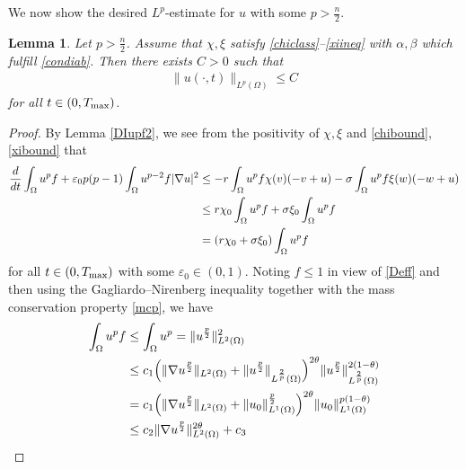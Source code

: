 \documentclass[12pt,reqno,draft]{article}
\numberwithin{equation}{section}
\theoremstyle{theorem}
\newtheorem{lem}[thm]{Lemma}
\theoremstyle{definition}
\newcommand{\ep}{\varepsilon}
\newcommand{\Tmax}{T_{\rm max}}
\begin{document}
We now show the desired $L^p$-estimate for $u$ 
with some $p>\frac{n}{2}$.
%
\begin{lem} \label{uLpbdd2}
 Let $p>\frac{n}{2}$. 
 Assume that $\chi, \xi$ satisfy \eqref{chiclass}--\eqref{xiineq} 
 with $\alpha, \beta$ which fulfill \eqref{condiab}. 
 Then there exists $C>0$ such that 
%
    \begin{align*}
             \|u(\cdot, t)\|_{L^p(\Omega)} \le C
    \end{align*}
 for all $t \in (0, \Tmax)$.
% 
\end{lem}
%
\begin{proof}
 By Lemma \ref{DIupf2}, we see from the 
 positivity of $\chi, \xi$ and \eqref{chibound}, \eqref{xibound} that 
%
\begin{align} \label{L34}
               \frac{d}{dt}\int_\Omega u^pf+\ep_0 p(p-1)\int_\Omega u^{p-2}f|\nabla u|^2
        &\le 
               -r\int_\Omega u^pf\chi(v)(-v+u)
               -\sigma\int_\Omega u^pf\xi(w)(-w+u)
    \notag\\
        &\le r\chi_0\int_\Omega u^pf+\sigma\xi_0\int_\Omega u^pf
    \notag\\
        &= (r\chi_0+\sigma \xi_0)\int_\Omega u^pf
    \end{align}
% 
for all $t \in (0, \Tmax)$ with some $\ep_0 \in (0,1)$. 
Noting $f \le 1$ in view of \eqref{Deff} and then 
using the Gagliardo--Nirenberg inequality together with
the mass conservation property \eqref{mcp}, we have 
%
    \begin{align}\label{GNest}
           \int_\Omega u^p f
    &\le \int_\Omega u^p=\|u^{\frac{p}{2}}\|_{L^2(\Omega)}^2\notag\\
    &\le c_1\Big(\|\nabla u^{\frac{p}{2}}\|_{L^2(\Omega)}
           +\|u^{\frac{p}{2}}\|_{L^{\frac{2}{p}}(\Omega)}\Big)^{2\theta}
           \|u^{\frac{p}{2}}\|_{L^{\frac{2}{p}}(\Omega)}^{2(1-\theta)}\notag\\
    &= c_1\Big(\|\nabla u^{\frac{p}{2}}\|_{L^2(\Omega)}
           +\|u_0\|_{L^1(\Omega)}^{\frac{p}{2}}\Big)^{2\theta}
           \|u_0\|_{L^1(\Omega)}^{p(1-\theta)}\notag\\
    &\le c_2\|\nabla u^{\frac{p}{2}}\|_{L^2(\Omega)}^{2\theta}
           +c_3
    \end{align}

\end{proof}
\end{document}

